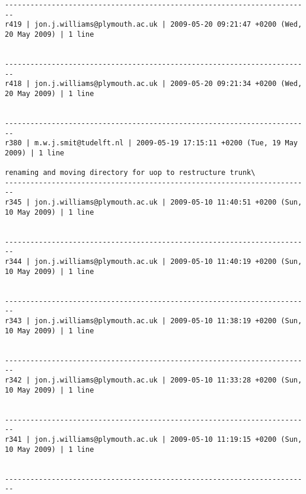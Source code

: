 \documentclass[9]{report}
\begin{document}
\begin{description}
\begin{verbatim}
------------------------------------------------------------------------
r419 | jon.j.williams@plymouth.ac.uk | 2009-05-20 09:21:47 +0200 (Wed, 20 May 2009) | 1 line


------------------------------------------------------------------------
r418 | jon.j.williams@plymouth.ac.uk | 2009-05-20 09:21:34 +0200 (Wed, 20 May 2009) | 1 line


------------------------------------------------------------------------
r380 | m.w.j.smit@tudelft.nl | 2009-05-19 17:15:11 +0200 (Tue, 19 May 2009) | 1 line

renaming and moving directory for uop to restructure trunk\
------------------------------------------------------------------------
r345 | jon.j.williams@plymouth.ac.uk | 2009-05-10 11:40:51 +0200 (Sun, 10 May 2009) | 1 line


------------------------------------------------------------------------
r344 | jon.j.williams@plymouth.ac.uk | 2009-05-10 11:40:19 +0200 (Sun, 10 May 2009) | 1 line


------------------------------------------------------------------------
r343 | jon.j.williams@plymouth.ac.uk | 2009-05-10 11:38:19 +0200 (Sun, 10 May 2009) | 1 line


------------------------------------------------------------------------
r342 | jon.j.williams@plymouth.ac.uk | 2009-05-10 11:33:28 +0200 (Sun, 10 May 2009) | 1 line


------------------------------------------------------------------------
r341 | jon.j.williams@plymouth.ac.uk | 2009-05-10 11:19:15 +0200 (Sun, 10 May 2009) | 1 line


------------------------------------------------------------------------


\end{verbatim}
\end{description}
\end{document}
